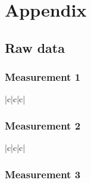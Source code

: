 \documentclass[a4paper]{article}
\makeatletter
\let\mcnewpage=\newpage
\newcommand{\TrickSupertabularIntoMulticols}{%
  \renewcommand\newpage{%
    \if@firstcolumn
      \hrule width\linewidth height0pt
      \columnbreak
    \else
      \mcnewpage
    \fi
  }%
}
\makeatother
\begin{document}
\pagebreak
\section*{Appendix}

\subsection*{Raw data}


\tabletail{\midrule} \tablelasttail{\bottomrule}

\subsubsection*{Measurement 1}

\begin{multicols}{3}

  \TrickSupertabularIntoMulticols

  \begin{supertabular}{|c|c|c|}
  \end{supertabular}

\end{multicols}

\pagebreak

\subsubsection*{Measurement 2}

\begin{multicols}{3}

  \TrickSupertabularIntoMulticols

  \begin{supertabular}{|c|c|c|}
  \end{supertabular}

\end{multicols}

\pagebreak

\subsubsection*{Measurement 3}
\end{document}
